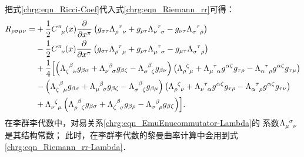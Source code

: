 把式\eqref{chrg:eqn_Ricci-Coef}代入式\eqref{chrg:eqn_Riemann_rr}可得：
\begin{align}
	R_{\rho\sigma\mu\nu} =&
	+\frac{1}{2} C_{\hphantom{\pi} \mu}^{\pi}(x) \frac{\partial }{\partial x^\pi}
	\left(g_{\sigma\tau}\Lambda_{\rho\hphantom{\sigma}\nu}^{\hphantom{\rho}\tau} 
	+ g_{\rho\tau}\Lambda_{\nu\hphantom{\rho}\sigma}^{\hphantom{\nu}\tau} 
	- g_{\nu\tau}\Lambda_{\sigma\hphantom{\nu}\rho}^{\hphantom{\sigma}\tau} \right) \notag \\
	&-\frac{1}{2} C_{\hphantom{\pi} \nu}^{\pi}(x) \frac{\partial }{\partial x^\pi} 
	\left(g_{\sigma\tau}\Lambda_{\rho\hphantom{\sigma}\mu}^{\hphantom{\rho}\tau}
	+ g_{\rho\tau}\Lambda_{\mu\hphantom{\rho}\sigma}^{\hphantom{\mu}\tau}
	- g_{\mu\tau}\Lambda_{\sigma\hphantom{\mu}\rho}^{\hphantom{\sigma}\tau} \right)\notag \\
	&+ \frac{1}{4}  \Bigl[ 
	\left(\Lambda_{\zeta\hphantom{\sigma}\nu}^{\hphantom{\zeta}\beta} g_{\beta\sigma}
	+ \Lambda_{\nu\hphantom{\zeta}\sigma}^{\hphantom{\nu}\beta} g_{\beta\zeta}
	- \Lambda_{\sigma\hphantom{\nu}\zeta}^{\hphantom{\sigma}\beta} g_{\beta\nu} \right)
	\left(\Lambda_{\rho\hphantom{\xi}\mu}^{\hphantom{\rho}\zeta}
	+ \Lambda_{\mu\hphantom{\rho}\alpha}^{\hphantom{\mu}\tau} g^{\alpha\zeta} g_{\tau\rho}
	- \Lambda_{\alpha\hphantom{\mu}\rho}^{\hphantom{\alpha}\tau} g^{\alpha\zeta} g_{\tau\mu} \right)\notag \\
	&- \left(\Lambda_{\zeta\hphantom{\sigma}\mu}^{\hphantom{\zeta}\beta} g_{\beta\sigma}
	+ \Lambda_{\mu\hphantom{\zeta}\sigma}^{\hphantom{\mu}\beta} g_{\beta\zeta}
	- \Lambda_{\sigma\hphantom{\mu}\zeta}^{\hphantom{\sigma}\beta} g_{\beta\mu} \right)
	\left(\Lambda_{\rho\hphantom{\xi}\nu}^{\hphantom{\rho}\zeta} 
	+ \Lambda_{\nu\hphantom{\rho}\alpha}^{\hphantom{\nu}\tau} g^{\alpha\zeta} g_{\tau\rho}
	- \Lambda_{\alpha\hphantom{\nu}\rho}^{\hphantom{\alpha}\tau} g^{\alpha\zeta} g_{\tau\nu} \right) \notag \\
	&+\Lambda_{\nu\hphantom{\xi}\mu}^{\hphantom{\nu}\zeta}
	\left(\Lambda_{\rho\hphantom{\sigma}\zeta}^{\hphantom{\rho}\beta}g_{\beta\sigma}
	+ \Lambda_{\zeta\hphantom{\rho}\sigma}^{\hphantom{\zeta}\beta}g_{\beta\rho}
	- \Lambda_{\sigma\hphantom{\zeta}\rho}^{\hphantom{\sigma}\beta}g_{\beta\zeta} \right)\Bigr] .
	\label{chrg:eqn_Riemann_rr-Lambda}
\end{align}
在李群李代数中，对易关系\eqref{chrg:eqn_EmuEnucommutator-Lambda}的
系数$\Lambda_{\mu\hphantom{\sigma}\nu}^{\hphantom{\mu}\sigma}$是其结构常数；
此时，在李群李代数的黎曼曲率计算中会用到式\eqref{chrg:eqn_Riemann_rr-Lambda}．


